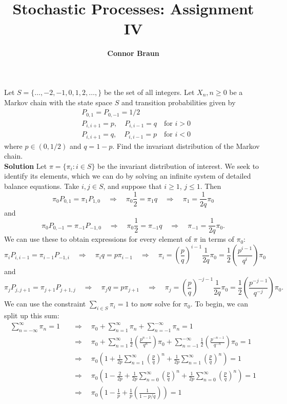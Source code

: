 \documentclass[11pt, letterpaper]{article}
\title{\bf Stochastic Processes: Assignment IV}
\author{\bf Connor Braun}
\date{}
\begin{document}
    
    \maketitle
     Let $S=\{\dots,-2,-1,0,1,2,\dots,\}$ be the set of all integers. Let $X_n,n\geq 0$ be a Markov chain with the state space $S$ and transition probabilities given by
    \begin{align*}
        &P_{0,1}=P_{0,-1}=1/2\\
        &P_{i,i+1}=p,\quad P_{i,i-1}=q\quad\text{for $i>0$}\\
        &P_{i,i+1}=q,\quad P_{i,i-1}=p\quad\text{for $i<0$}
    \end{align*}
    where $p\in(0,1/2)$ and $q=1-p$. Find the invariant distribution of the Markov chain.\\[10pt]
    {\bf Solution} Let $\pi=\{\pi_i:i\in S\}$ be the invariant distribution of interest. We seek to identify its elements, which we can do by solving an infinite system of detailed balance equations. Take $i,j\in S$, and suppose that $i\geq 1$, $j\leq 1$. Then
    \[\pi_0P_{0,1}=\pi_1P_{1,0} \quad\Rightarrow\quad \pi_0\frac{1}{2}=\pi_1q\quad\Rightarrow\quad \pi_1=\frac{1}{2q}\pi_0\]
    and
    \[\pi_0P_{0,-1}=\pi_{-1}P_{-1,0} \quad\Rightarrow\quad \pi_0\frac{1}{2}=\pi_{-1}q\quad\Rightarrow\quad \pi_{-1}=\frac{1}{2q}\pi_0.\]
    We can use these to obtain expressions for every element of $\pi$ in terms of $\pi_0$:
    \[\pi_{i}P_{i,i-1}=\pi_{i-1}P_{-1,i}\quad\Rightarrow\quad \pi_{i}q=p\pi_{i-1}\quad\Rightarrow\quad\pi_i=\left(\frac{p}{q}\right)^{i-1}\frac{1}{2q}\pi_0=\frac{1}{2}\left(\frac{p^{i-1}}{q^i}\right)\pi_0\]
    and
    \[\pi_{j}P_{j,j+1}=\pi_{j+1}P_{j+1,j}\quad\Rightarrow\quad \pi_jq=p\pi_{j+1}\quad\Rightarrow\quad\pi_j=\left(\frac{p}{q}\right)^{-j-1}\frac{1}{2q}\pi_0=\frac{1}{2}\left(\frac{p^{-j-1}}{q^{-j}}\right)\pi_0.\]
    We can use the constraint $\sum_{i\in S}\pi_i=1$ to now solve for $\pi_0$. To begin, we can split up this sum:
    \begin{align*}
        \sum_{n=-\infty}^\infty\pi_n=1\quad&\Rightarrow\quad\pi_0+\sum_{n=1}^\infty\pi_n+\sum_{n=-1}^{-\infty}\pi_n=1\\
        &\Rightarrow\quad\pi_0+\sum_{n=1}^\infty\frac{1}{2}\left(\frac{p^{n-1}}{q^n}\right)\pi_0+\sum_{n=-1}^{-\infty}\frac{1}{2}\left(\frac{p^{-n-1}}{q^{-n}}\right)\pi_0=1\\
        &\Rightarrow\quad\pi_0\left(1+\frac{1}{2p}\sum_{n=1}^\infty\left(\frac{p}{q}\right)^n+\frac{1}{2p}\sum_{n=1}^\infty\left(\frac{p}{q}\right)^n\right)=1\\
        &\Rightarrow\quad\pi_0\left(1-\frac{2}{2p}+\frac{1}{2p}\sum_{n=0}^\infty\left(\frac{p}{q}\right)^n+\frac{1}{2p}\sum_{n=0}^\infty\left(\frac{p}{q}\right)^n\right)=1\\
        &\Rightarrow\quad\pi_0\left(1-\frac{1}{p}+\frac{1}{p}\left(\frac{1}{1-p/q}\right)\right)=1
    \end{align*}
\end{document}
